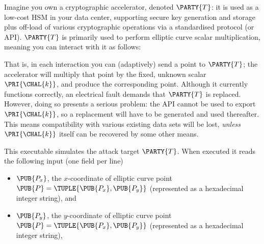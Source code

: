 %



Imagine you own a cryptographic accelerator, denoted $\PARTY{T}$: it is used
as a low-cost HSM in your data center, supporting secure key generation and 
storage plus off-load of various cryptographic operations via a standardised 
protocol (or API).  $\PARTY{T}$ is primarily used to perform elliptic curve
scalar multiplication, meaning you can interact with it as follows:

\begin{center}

\end{center}

\noindent
That is, in each interaction you can (adaptively) send 
a point
to $\PARTY{T}$; the accelerator will
multiply that point by the fixed, unknown scalar $\PRI{\CHAL{k}}$,
and produce 
the corresponding point.
Although it currently functions correctly, an electrical fault demands that
$\PARTY{T}$ is replaced.  However, doing so presents a serious problem: the 
API cannot be used to export $\PRI{\CHAL{k}}$, so a replacement will have 
to be generated and used thereafter.  This means compatibility with various
existing data sets will be lost, {\em unless} $\PRI{\CHAL{k}}$ itself can 
be recovered by some other means.




This executable simulates the attack target $\PARTY{T}$.  When executed it 
 reads the following  input (one field per line)

\begin{itemize}
\item $\PUB{P_x}$,
      the $x$-coordinate of elliptic curve point $\PUB{P} = \TUPLE{ \PUB{P_x}, \PUB{P_y} }$
      (represented as a                   hexadecimal integer string),
      and
\item $\PUB{P_y}$,
      the $y$-coordinate of elliptic curve point $\PUB{P} = \TUPLE{ \PUB{P_x}, \PUB{P_y} }$
      (represented as a                   hexadecimal integer string),
\end{itemize}

